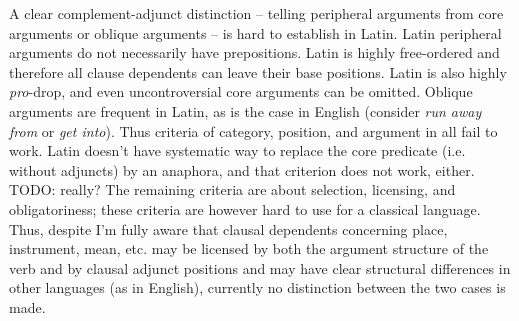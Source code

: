 \documentclass[a4paper, oneside]{report}
\newcommand*{\citesec}[1]{\S~{#1}}
\newcommand*{\term}[1]{\emph{#1}}
\newcommand{\form}[1]{\emph{#1}}
\begin{document}
A clear complement-adjunct distinction 
-- telling peripheral arguments from core arguments or oblique arguments --
is hard to establish in Latin.
Latin peripheral arguments do not necessarily have prepositions.
Latin is highly free-ordered and therefore all clause dependents 
can leave their base positions.
Latin is also highly \term{pro}-drop,
and even uncontroversial core arguments can be omitted.
Oblique arguments are frequent in Latin,
as is the case in English 
(consider \form{run away from} or \form{get into}).
Thus criteria of category, position, and argument in \citet[\citesec{4.1.2}]{cgel} 
all fail to work.
Latin doesn't have systematic way to replace the core predicate (i.e. without adjuncts) by an anaphora,
and that criterion does not work, either. TODO: really?
The remaining criteria are about selection, licensing, and obligatoriness;
these criteria are however hard to use for a classical language. 
Thus, despite I'm fully aware that  
clausal dependents concerning place, instrument, mean, etc. 
may be licensed by both the argument structure of the verb 
and by clausal adjunct positions 
and may have clear structural differences in other languages 
(as in English), 
currently no distinction between the two cases is made.
\end{document}

